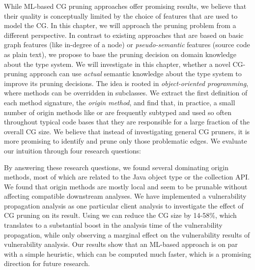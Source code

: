 While ML-based CG pruning approaches offer promising results, we believe that their quality is conceptually limited by the choice of features that are used to model the CG.
In this chapter, we will approach the pruning problem from a different perspective.
In contrast to existing approaches that are based on basic graph features (like in-degree of a node) or \emph{pseudo-semantic} features (source code as plain text), we propose to base the pruning decision on domain knowledge about the type system.
We will investigate in this chapter, whether a novel CG-pruning approach can use \emph{actual} semantic knowledge about the type system to improve its pruning decisions.
The idea is rooted in \emph{object-oriented programming}, where methods can be overridden in subclasses.
We extract the first definition of each method signature, the \emph{origin method}, and find that, in practice, a small number of origin methods like  or  are frequently subtyped and used so often throughout typical code bases that they are responsible for a large fraction of the overall CG size.
We believe that instead of investigating general CG pruners, it is more promising to identify and prune only those problematic edges.
We evaluate our intuition through four research questions:
\NewDocumentCommand{}
\NewDocumentCommand{}
\NewDocumentCommand{}
\NewDocumentCommand{}

\begin{description}
\item[] \rqOneOP
\item[] \rqTwoOP
\item[] \rqThreeOP
\item[] \rqFourOP
\end{description}

By answering these research questions, we found several dominating origin methods, most of which are related to the Java object type or the collection API.
We found that origin methods are mostly local and seem to be prunable without affecting compatible downstream analyses. %
We have implemented a vulnerability propagation analysis as one particular client analysis to investigate the effect of CG pruning on its result.
Using  we can reduce the CG size by 14-58\%, which translates to a substantial boost in the analysis time of the vulnerability propagation, while only observing a marginal effect on the vulnerability results of vulnerability analysis.
Our results show that an ML-based approach is on par with a simple heuristic, which can be computed much faster, which is a promising direction for future research.

